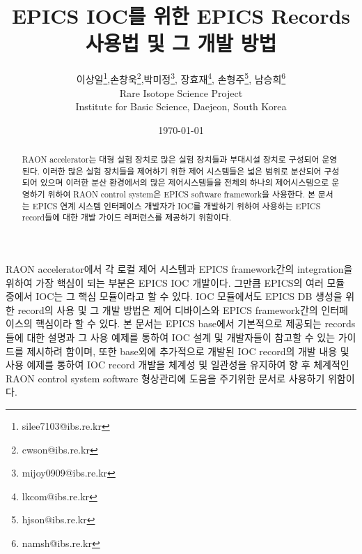 \documentclass[11pt
  , a4paper
  , article
  , oneside
]{memoir}
\begin{document}
\newcommand{\technumber}{
  RAON Control-Document Series\\
  Revision : v1.0,   Release : 2015-06-08 fixed date}
\title{\textbf{EPICS IOC를 위한 EPICS Records 사용법 및 그 개발 방법}}

\author{이상일\thanks{silee7103@ibs.re.kr},손창욱\thanks{cwson@ibs.re.kr},박미정\thanks{mijoy0909@ibs.re.kr}, 장효재\thanks{lkcom@ibs.re.kr}, 손형주\thanks{hjson@ibs.re.kr}, 남승희\thanks{namsh@ibs.re.kr} \\

  Rare Isotope Science Project\\
  Institute for Basic Science, Daejeon, South Korea
}
\date{\today}

\renewcommand{\maketitlehooka}{\begin{flushright}\textsf{\technumber}\end{flushright}}

\maketitle

\begin{abstract}
RAON accelerator는 대형 실험 장치로 많은 실험 장치들과 부대시설 장치로 구성되어 운영된다. 이러한 많은 실험 장치들을 제어하기 위한 제어 시스템들은 넓은 범위로 분산되어 구성되어 있으며 이러한 분산 환경에서의 많은 제어시스템들을 전체의 하나의 제어시스템으로 운영하기 위하여 RAON control system은 EPICS software framework을 사용한다. 본 문서는 EPICS 연계 시스템 인터페이스 개발자가 IOC를 개발하기 위하여 사용하는 EPICS record들에 대한 개발 가이드 레퍼런스를 제공하기 위함이다.
\end{abstract}

RAON accelerator에서 각 로컬 제어 시스템과 EPICS framework간의 integration을 위하여 가장 핵심이 되는 부분은 EPICS IOC 개발이다. 그만큼 EPICS의 여러 모듈 중에서 IOC는 그 핵심 모듈이라고 할 수 있다. IOC 모듈에서도 EPICS DB 생성을 위한 record의 사용 및 그 개발 방법은 제어 디바이스와 EPICS framework간의 인터페이스의 핵심이라 할 수 있다. 본 문서는 EPICS base에서 기본적으로 제공되는 records들에 대한 설명과 그 사용 예제를 통하여 IOC 설계 및 개발자들이 참고할 수 있는 가이드를 제시하려 함이며, 또한 base외에 추가적으로 개발된 IOC record의 개발 내용 및 사용 예제를 통하여 IOC record 개발을 체계성 및 일관성을 유지하여 향 후 체계적인 RAON control system software 형상관리에 도움을 주기위한 문서로 사용하기 위함이다.
\end{document}
